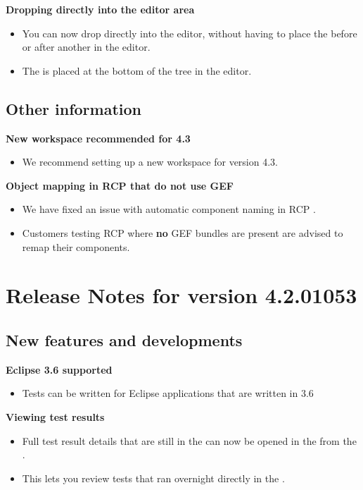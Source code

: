 \textbf{Dropping \gdcases{} directly into the editor area}
\begin{itemize}
\item You can now drop \gdcases{} directly into the editor, without having to place the \gdcase{} before or after another \gdcase{} in the editor.
\item The \gdcase{} is placed at the bottom of the tree in the editor.
\end{itemize}

\subsection{Other information}
\textbf{New workspace recommended for 4.3}
\begin{itemize}
\item We recommend setting up a new workspace for version 4.3. 
\end{itemize}
\textbf{Object mapping in RCP \gdauts{} that do not use GEF}
\begin{itemize}
\item We have fixed an issue with automatic component naming in RCP \gdauts{}.
\item Customers testing RCP \gdauts{} where \textbf{no} GEF bundles are present are advised to remap their components. 
\end{itemize}
\makeatletter
\section{Release Notes for version 4.2.01053}
\makeatother
\subsection{New features and developments}

\textbf{Eclipse 3.6 supported}
\begin{itemize}
\item Tests can be written for  Eclipse applications that are written in 3.6
\end{itemize}

\textbf{Viewing test results}
\begin{itemize}
\item Full test result details that are still in the \gddb{} can now be opened in the \gdtestresultview{} from the \gdtestsummaryview{}. 
\item This lets you review tests that ran overnight directly in the \ite{}. 
\end{itemize}

